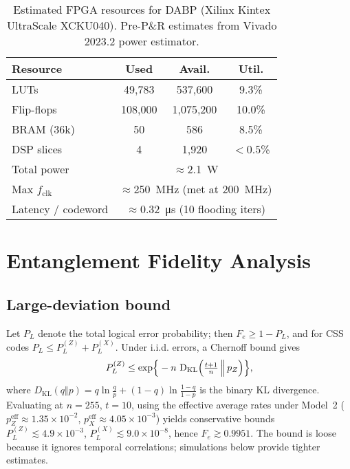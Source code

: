 \begin{table}[t!]
\small
\centering
\caption{Estimated FPGA resources for DABP (Xilinx Kintex UltraScale XCKU040). Pre-P\&R estimates from Vivado 2023.2 power estimator.}
\label{tab:resources}
\begin{adjustbox}{width=\linewidth}
\begin{tabular}{lccc}
\toprule
Resource & Used & Avail. & Util. \\
\midrule
LUTs & 49{,}783 & 537{,}600 & 9.3\% \\
Flip-flops & 108{,}000 & 1{,}075{,}200 & 10.0\% \\
BRAM (36k) & 50 & 586 & 8.5\% \\
DSP slices & 4 & 1{,}920 & $<0.5$\% \\
\midrule
Total power & \multicolumn{3}{c}{\(\approx\)\SI{2.1}{\watt}} \\
Max \(f_\mathrm{clk}\) & \multicolumn{3}{c}{\(\approx\)\SI{250}{\mega\hertz} (met at \SI{200}{\mega\hertz})} \\
Latency / codeword & \multicolumn{3}{c}{\(\approx\)\SI{0.32}{\micro\second} (10 flooding iters)} \\
\bottomrule
\end{tabular}
\end{adjustbox}
\end{table}

\section{Entanglement Fidelity Analysis}\label{sec:analysis}

\subsection{Large-deviation bound}\label{sec:fidelity_bound}
Let \(P_L\) denote the total logical error probability; then \(F_e \ge 1-P_L\), and for CSS codes \(P_L \le P_L^{(Z)}+P_L^{(X)}\). Under i.i.d. errors, a Chernoff bound gives
\begin{equation}
P_L^{(Z)} \le \exp\!\Big\{-n\, \operatorname{D_{\mathrm{KL}}}\!\Big(\tfrac{t+1}{n}\,\Big\Vert\, p_Z\Big)\Big\},
\end{equation}
where \(D_{\mathrm{KL}}(q\Vert p)=q\ln\frac{q}{p}+(1-q)\ln\frac{1-q}{1-p}\) is the binary KL divergence. Evaluating at \(n=255\), \(t=10\), using the effective average rates under Model~2 (\(p_Z^{\mathrm{eff}}\approx1.35\times10^{-2}\), \(p_X^{\mathrm{eff}}\approx4.05\times10^{-3}\)) yields conservative bounds \(P_L^{(Z)} \lesssim 4.9\times10^{-3}\), \(P_L^{(X)} \lesssim 9.0\times10^{-8}\), hence \(F_e \gtrsim 0.9951\). The bound is loose because it ignores temporal correlations; simulations below provide tighter estimates.

